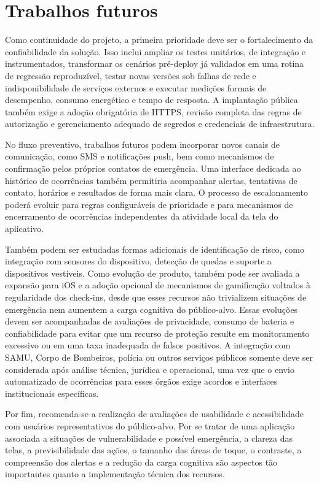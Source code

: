 \section{Trabalhos futuros}

Como continuidade do projeto, a primeira prioridade deve ser o fortalecimento da confiabilidade da solução. Isso inclui ampliar os testes unitários, de integração e instrumentados, transformar os cenários pré-deploy já validados em uma rotina de regressão reproduzível, testar novas versões sob falhas de rede e indisponibilidade de serviços externos e executar medições formais de desempenho, consumo energético e tempo de resposta. A implantação pública também exige a adoção obrigatória de HTTPS, revisão completa das regras de autorização e gerenciamento adequado de segredos e credenciais de infraestrutura.

No fluxo preventivo, trabalhos futuros podem incorporar novos canais de comunicação, como SMS e notificações push, bem como mecanismos de confirmação pelos próprios contatos de emergência. Uma interface dedicada ao histórico de ocorrências também permitiria acompanhar alertas, tentativas de contato, horários e resultados de forma mais clara. O processo de escalonamento poderá evoluir para regras configuráveis de prioridade e para mecanismos de encerramento de ocorrências independentes da atividade local da tela do aplicativo.

Também podem ser estudadas formas adicionais de identificação de risco, como integração com sensores do dispositivo, detecção de quedas e suporte a dispositivos vestíveis. Como evolução de produto, também pode ser avaliada a expansão para iOS e a adoção opcional de mecanismos de gamificação voltados à regularidade dos check-ins, desde que esses recursos não trivializem situações de emergência nem aumentem a carga cognitiva do público-alvo. Essas evoluções devem ser acompanhadas de avaliações de privacidade, consumo de bateria e confiabilidade para evitar que um recurso de proteção resulte em monitoramento excessivo ou em uma taxa inadequada de falsos positivos. A integração com SAMU, Corpo de Bombeiros, polícia ou outros serviços públicos somente deve ser considerada após análise técnica, jurídica e operacional, uma vez que o envio automatizado de ocorrências para esses órgãos exige acordos e interfaces institucionais específicas.

Por fim, recomenda-se a realização de avaliações de usabilidade e acessibilidade com usuários representativos do público-alvo. Por se tratar de uma aplicação associada a situações de vulnerabilidade e possível emergência, a clareza das telas, a previsibilidade das ações, o tamanho das áreas de toque, o contraste, a compreensão dos alertas e a redução da carga cognitiva são aspectos tão importantes quanto a implementação técnica dos recursos.

